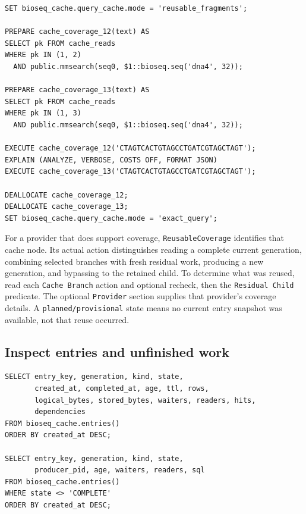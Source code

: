 \par\noindent\begin{minipage}{\linewidth}
\begin{lstlisting}[style=bioseq-appendix-sql,
  caption={Two related requests; partial BioSeqDB reuse is not implemented.}]
SET bioseq_cache.query_cache.mode = 'reusable_fragments';

PREPARE cache_coverage_12(text) AS
SELECT pk FROM cache_reads
WHERE pk IN (1, 2)
  AND public.mmsearch(seq0, $1::bioseq.seq('dna4', 32));

PREPARE cache_coverage_13(text) AS
SELECT pk FROM cache_reads
WHERE pk IN (1, 3)
  AND public.mmsearch(seq0, $1::bioseq.seq('dna4', 32));

EXECUTE cache_coverage_12('CTAGTCACTGTAGCCTGATCGTAGCTAGT');
EXPLAIN (ANALYZE, VERBOSE, COSTS OFF, FORMAT JSON)
EXECUTE cache_coverage_13('CTAGTCACTGTAGCCTGATCGTAGCTAGT');

DEALLOCATE cache_coverage_12;
DEALLOCATE cache_coverage_13;
SET bioseq_cache.query_cache.mode = 'exact_query';
\end{lstlisting}
\end{minipage}

For a provider that does support coverage, \texttt{ReusableCoverage} identifies
that cache node. Its actual action distinguishes reading a complete current
generation, combining selected branches with fresh residual work, producing
a new generation, and bypassing to the retained child. To determine what
was reused, read each \texttt{Cache Branch} action and optional recheck,
then the \texttt{Residual Child} predicate. The optional \texttt{Provider}
section supplies that provider's coverage details. A
\texttt{planned/provisional} state means no current entry snapshot was
available, not that reuse occurred.

\subsection{Inspect entries and unfinished work}

\par\noindent\begin{minipage}{\linewidth}
\begin{lstlisting}[style=bioseq-appendix-sql,
  caption={Inspect individual cache generations.}]
SELECT entry_key, generation, kind, state,
       created_at, completed_at, age, ttl, rows,
       logical_bytes, stored_bytes, waiters, readers, hits,
       dependencies
FROM bioseq_cache.entries()
ORDER BY created_at DESC;

SELECT entry_key, generation, kind, state,
       producer_pid, age, waiters, readers, sql
FROM bioseq_cache.entries()
WHERE state <> 'COMPLETE'
ORDER BY created_at DESC;
\end{lstlisting}
\end{minipage}

